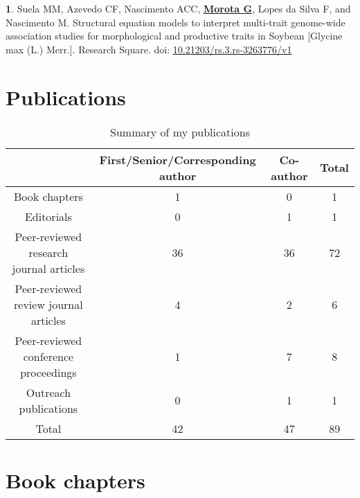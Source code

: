 \documentclass[margin,line,10pt]{res}
\newenvironment{list1}{
  \begin{list}{\ding{113}}{%
      \setlength{\itemsep}{0in}
      \setlength{\parsep}{0in} \setlength{\parskip}{0in}
      \setlength{\topsep}{0in} \setlength{\partopsep}{0in} 
      \setlength{\leftmargin}{0.17in}}}{\end{list}}
\begin{document}
\begin{resume}
\begin{list1}
  \vspace{0.5cm}

  \item  [{\bf 1}.] Suela MM, Azevedo CF, Nascimento ACC, \textbf{\underline{Morota G}}, Lopes da Silva F, and Nascimento M. Structural equation models to interpret multi-trait genome-wide association studies for morphological and productive traits in Soybean [Glycine max (L.) Merr.].  Research Square. doi: \textcolor{blue}{\href{https://doi.org/10.21203/rs.3.rs-3263776/v1}{10.21203/rs.3.rs-3263776/v1}}


\end{list1}

  
\vspace{0.5cm}


\section{\sc Publications}
\vspace{1cm}

\begin{table}[h!]
\centering
  \begin{tabular}{ |c|c|c|c| }
 \hline
 & First/Senior/Corresponding author & Co-author & Total \\  \hline
 Book chapters & 1 & 0 & 1 \\ \hline
 Editorials & 0 & 1 & 1 \\ \hline
 Peer-reviewed research journal articles  & 36 & 36 & 72 \\  \hline
 Peer-reviewed review journal articles  & 4 & 2 & 6 \\  \hline
 Peer-reviewed conference proceedings & 1 & 7 & 8 \\ \hline
 Outreach publications & 0 & 1 & 1 \\ \hline
 Total & 42 &  47 & 89 \\ \hline
  \end{tabular}
    \caption{Summary of my publications}
\end{table}


\vspace{1.5cm}
\section{\sc Book chapters}
\vspace{1.0cm}

\section{}
\begin{list1}


\end{list1}
\end{resume}
\end{document}
